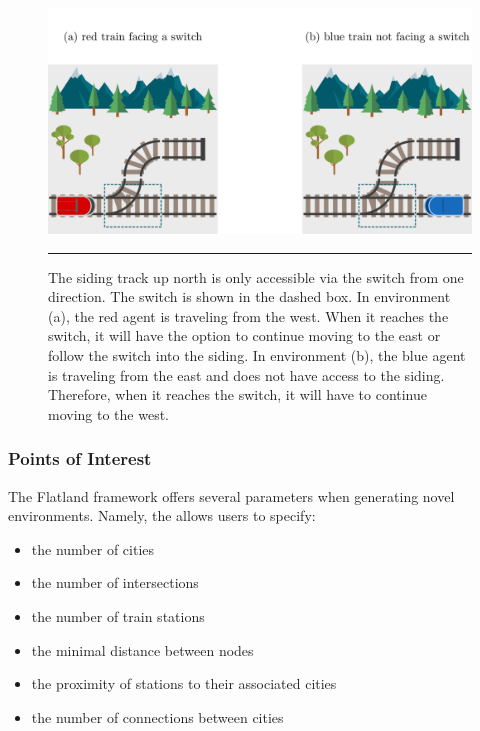 \documentclass[11pt]{article}
\begin{document}
\begin{figure}[t]
\centering
\includegraphics[width=\textwidth]{transitions}
\caption{The siding track up north is only accessible via the switch from one direction.  The switch is shown in the dashed box.  In environment (a), the red agent is traveling from the west.  When it reaches the switch, it will have the option to continue moving to the east or follow the switch into the siding.  In environment (b), the blue agent is traveling from the east and does not have access to the siding.  Therefore, when it reaches the switch, it will have to continue moving to the west.}

\begin{center}
{\color{lightgray} \rule{\linewidth}{0.15mm}}
\end{center}

\label{fig:transitions}
\end{figure}



\subsubsection{Points of Interest}
The Flatland framework offers several parameters when generating novel environments.  Namely, the  allows users to specify:
\begin{itemize}
	\item the number of cities
	\item the number of intersections
	\item the number of train stations
	\item the minimal distance between nodes
	\item the proximity of stations to their associated cities
	\item the number of connections between cities
\end {itemize}
\end{document}
